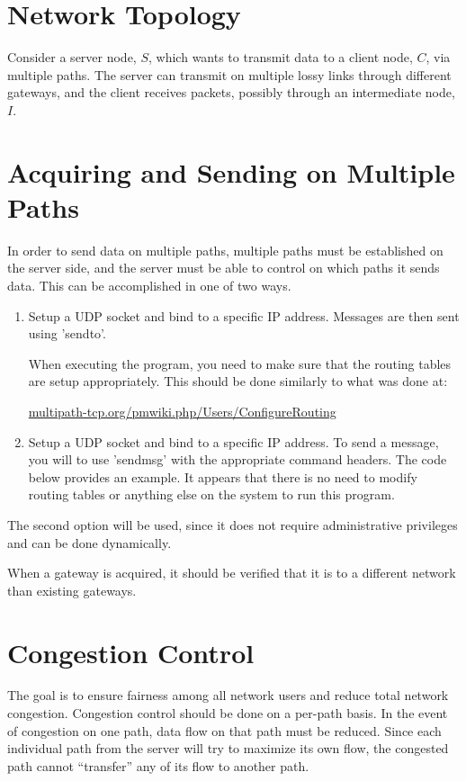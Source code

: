 \documentclass{article}
\begin{document}
\section{Network Topology}
Consider a server node, $S$, which wants to transmit data to a client node, $C$, via multiple paths.  The server can transmit on multiple lossy links through different gateways, and the client receives packets, possibly through an intermediate node, $I$.

\section{Acquiring and Sending on Multiple Paths}
In order to send data on multiple paths, multiple paths must be established on the server side, and the server must be able to control on which paths it sends data.  This can be accomplished in one of two ways.

\begin{enumerate}
\item
Setup a UDP socket and bind to a specific
IP address. Messages are then sent using
'sendto'.

When executing the program,
you need to make sure that the routing 
tables are setup appropriately.  This 
should be done similarly to what was 
done at: 

\url{multipath-tcp.org/pmwiki.php/Users/ConfigureRouting}

\item
Setup a UDP socket and bind to a specific
IP address. To send a message, you will
to use 'sendmsg' with the appropriate 
command headers.  The code below provides
an example.  It appears that there is no 
need to modify routing tables or anything
else on the system to run this program.
\end{enumerate}
%
The second option will be used, since it does not require administrative privileges and can be done dynamically.

When a gateway is acquired, it should be verified that it is to a different network than existing gateways.

\section{Congestion Control}
The goal is to ensure fairness among all network users and reduce total network congestion. 
Congestion control should be done on a per-path basis.  In the event of congestion on one path, data flow on that path must be reduced.  Since each individual path from the server will try to maximize its own flow, the congested path cannot ``transfer'' any of its flow to another path.
\end{document}
